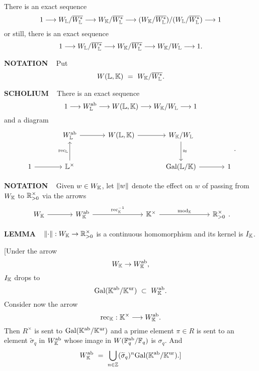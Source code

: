 There is an exact sequence 
\[
1 \longrightarrow 
W_{\mathbb{L}} /\overline{W_{\mathbb{L}}^*} \longrightarrow 
W_{\mathbb{K}} /\overline{W_{\mathbb{L}}^*} \longrightarrow 
(W_{\mathbb{K}} /\overline{W_{\mathbb{L}}^*})  / (W_{\mathbb{L}} /\overline{W_{\mathbb{L}}^*}) \longrightarrow 
1
\]
or still, there is an exact sequence
\[
1 \longrightarrow 
W_{\mathbb{L}} /\overline{W_{\mathbb{L}}^*} \longrightarrow 
W_{\mathbb{K}} /\overline{W_{\mathbb{L}}^*} \longrightarrow 
W_{\mathbb{K}}   / W_{\mathbb{L}} \longrightarrow 
1.
\]

\vspace{0.2cm}

\begin{x}{\small\bf NOTATION} \ %
Put 
\[
W(\mathbb{L},\mathbb{K}) \ = \ W_{\mathbb{K}} /\overline{W_{\mathbb{L}}^*}.
\]
\end{x}

\vspace{0.1cm}

\begin{x}{\small\bf SCHOLIUM} \ %
There is an exact sequence
\[
1 \longrightarrow 
W_{\mathbb{L}}^{\text{ab}} \longrightarrow
W(\mathbb{L},\mathbb{K}) \longrightarrow 
W_{\mathbb{K}} /W_{\mathbb{L}} \longrightarrow
1
\]
and a diagram
\[
\begin{tikzcd}[sep=large]
&{W_\LL^\ab}   \ar{r}
&{W(\LL,\K)} \ar{r}
&{W_\K / W_\LL} \ar{d}{\approx}\\
{1} \ar{r} &{\LL^\times} \ar{u}{\rec_\LL} &&{\Gal(\LL / \K)} \ar{r} &{1}
\end{tikzcd}
.
\]
\end{x}

\vspace{0.1cm}

\begin{x}{\small\bf NOTATION} \ %
Given $w \in W_{\mathbb{K}}$, let $\left\lVert w \right\rVert$ denote the effect on $w$ of passing
from $W_{\mathbb{K}}$ to $\mathbb{R}_{>0}^\times$ via the arrows 
\[
\begin{tikzcd}[sep=large]
{W_\K} \ar{r} 
&{W_\K^\ab} \ar{rr}{\rec_\K^{-1}}
&&{\K^\times} \ar{rr}{\mods_\K}
&&{\R_{>0}^\times}
\end{tikzcd}
.
\]
\end{x}

\vspace{0.1cm}

\begin{x}{\small\bf LEMMA} \ %
$\left\lVert \cdot \right\rVert:W_{\mathbb{K}} \rightarrow \mathbb{R}_{>0}^\times$ is a continuous homomorphism and its kernel is $I_{\mathbb{K}}$.

[Under the arrow 
\[
W_{\mathbb{K}} \rightarrow W_{\mathbb{K}}^{\text{ab}},
\]
$I_{\mathbb{K}}$ drops to 
\[
\Gal(\K^\ab / \K^\ur) \ \subset \ W_\K^\ab.
\]
Consider now the arrow
\[
\text{rec}_{\mathbb{K}}:\mathbb{K}^\times \longrightarrow W_{\mathbb{K}}^{\text{ab}}.
\]
Then $R^\times$ is sent to $\text{Gal}(\mathbb{K}^{\text{ab}} / \mathbb{K}^{\text{ur}})$ and a prime element $\pi \in R$ is sent to an element 
$\widetilde{\sigma}_q$ in $W_{\mathbb{K}}^{\text{ab}}$ whose image in $W(\mathbb{F}_q^{\text{ab}} / \mathbb{F}_q)$ is $\sigma_q$.  And 
\[
W_{\mathbb{K}}^{\text{ab}} \ = \ \bigcup\limits_{n \in \mathbb{Z}} (\widetilde{\sigma}_q)^n \text{Gal}(\mathbb{K}^{\text{ab}} / \mathbb{K}^{\text{ur}}).]
\]
\end{x}

